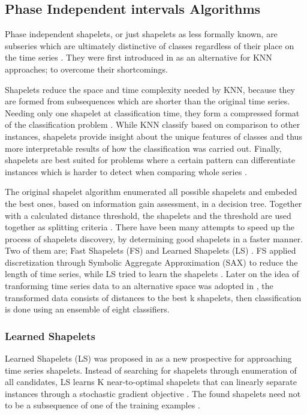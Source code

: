 \subsection{Phase Independent intervals Algorithms}
\label{SubsectionShapelet}
Phase independent shapelets, or just shapelets as less formally known,
are subseries which are ultimately distinctive of classes regardless of their place on the time series \cite{schafer2017fast,bagnall2017great}.
They were first introduced in \cite{ye2009time} as an alternative for KNN approaches; to overcome their shortcomings.

Shapelets reduce the space and time complexity needed by KNN, because they are formed from subsequences which are shorter than
the original time series. Needing only one shapelet at classification time, they form a compressed format of the classification problem \cite{bostrom2017shapelet,ye2009time,mueen2011logical}.
While KNN classify based on comparison to other instances, shapelets provide insight about the unique features of classes and thus more
interpretable results of how the classification was carried out.
Finally, shapelets are best suited for problems where a certain pattern can differentiate instances which is harder to detect when comparing whole series \cite{bagnall2017great,Bostrom2017}.

The original shapelet algorithm enumerated all possible shapelets and embeded the best ones, based on information gain assessment, in a decision tree.
Together with a calculated distance threshold, the shapelets and the threshold are used together as splitting criteria \cite{lines2018time,schafer2015boss}.
There have been many attempts to speed up the process of shapelets discovery, by determining good shapelets in a faster manner.
Two of them are; Fast Shapelets (FS) \cite{rakthanmanon2013fast} and Learned Shapelets (LS) \cite{grabocka2014learning}.
FS applied discretization through Symbolic Aggregate Approximation (SAX) to reduce the length of time series,
while LS tried to learn the shapelets \cite{shifaz2020ts}.
Later on the idea of tranforming time series data to an alternative space was adopted in \cite{hills2014classification},
the transformed data consists of distances to the best k shapelets, then classification is done using an ensemble of eight classifiers.

\subsubsection{Learned Shapelets}
\label{SubsubsectionLS}
Learned Shapelets (LS) was proposed in \cite{grabocka2014learning} as a new prospective for approaching time series shapelets.
Instead of searching for shapelets through enumeration of all candidates, LS learns K near-to-optimal shapelets that can linearly
separate instances through a stochastic gradient objective \cite{lines2018time,bostrom2018shapelet}.
The found shapelets need not to be a subsequence of one of the training examples \cite{bagnall2017great,schafer2017fast}.

